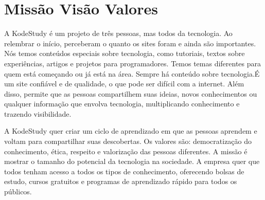 \chapter{Missão Visão Valores}
\label{ch:Missão Visão Valores}


A KodeStudy é um projeto de três pessoas, mas todos da tecnologia. Ao relembrar o início, perceberam o quanto os sites foram e ainda são importantes. Nós temos conteúdos especiais sobre tecnologia, como tutoriais, textos sobre experiências, artigos e projetos para programadores. Temos temas diferentes para quem está começando ou já está na área. Sempre há conteúdo sobre tecnologia.É um site confiável e de qualidade, o que pode ser difícil com a internet. Além disso, permite que as pessoas compartilhem suas ideias, novos conhecimentos ou qualquer informação que envolva tecnologia, multiplicando conhecimento e trazendo visibilidade.

    \vspace{12pt}

A KodeStudy quer criar um ciclo de aprendizado em que as pessoas aprendem e voltam para compartilhar suas descobertas. Os valores são: democratização do conhecimento, ética, respeito e valorização das pessoas diferentes. A missão é mostrar o tamanho do potencial da tecnologia na sociedade. A empresa quer que todos tenham acesso a todos os tipos de conhecimento, oferecendo bolsas de estudo, cursos gratuitos e programas de aprendizado rápido para todos os públicos.
